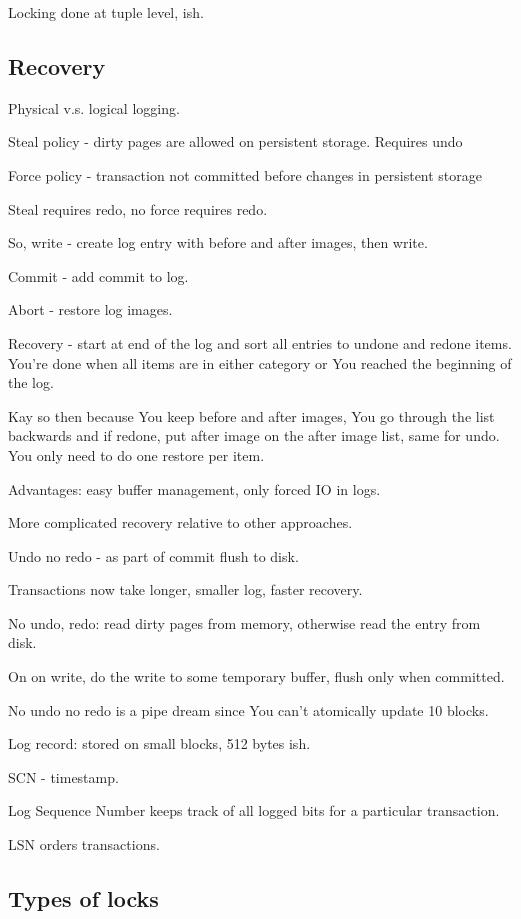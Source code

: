 \documentclass{article}
\begin{document}
		Locking done at tuple level, ish. 
		
	\subsection{Recovery}
	
		Physical v.s. logical logging.
		
		Steal policy - dirty pages are allowed on persistent storage. Requires undo
		
		Force policy - transaction not committed before changes in persistent storage
		
		Steal requires redo, no force requires redo.
		
		So, write - create log entry with before and after images, then write.
		
		Commit - add commit to log.
		
		Abort - restore log images.
		
		Recovery - start at end of the log and sort all entries to undone and redone items. You're done when all items are in either category or You reached the beginning of the log.
		
		Kay so then because You keep before and after images, You go through the list backwards and if redone, put after image on the after image list, same for undo. You only need to do one restore per item.
		
		Advantages: easy buffer management, only forced IO in logs.
		
		More complicated recovery relative to other approaches.
		
		Undo no redo - as part of commit flush to disk.
		
		Transactions now take longer, smaller log, faster recovery.
		
		No undo, redo: read dirty pages from memory, otherwise read the entry from disk.
		
		On on write, do the write to some temporary buffer, flush only when committed.
		
		No undo no redo is a pipe dream since You can't atomically update 10 blocks.
		
		Log record: stored on small blocks, 512 bytes ish.
		
		SCN - timestamp.
		
		Log Sequence Number keeps track of all logged bits for a particular transaction.
		
		LSN orders transactions.
		
	\subsection{Types of locks}
	
\end{document}
